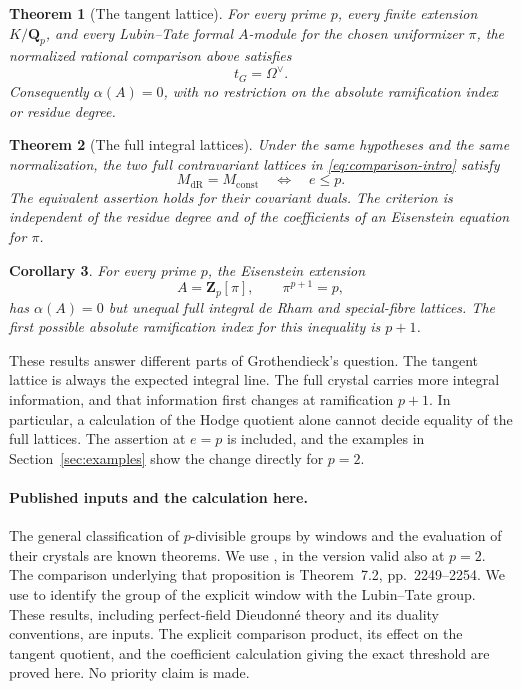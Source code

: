 \documentclass[11pt]{article}
\newtheorem{theorem}{Theorem}[section]
\newtheorem{corollary}[theorem]{Corollary}
\theoremstyle{definition}\newtheorem{definition}[theorem]{Definition}
\theoremstyle{remark}\newtheorem{remark}[theorem]{Remark}
\newcommand{\ZZ}{\mathbf Z}
\newcommand{\QQ}{\mathbf Q}
\newcommand{\dR}{\mathrm{dR}}
\begin{document}
\begin{theorem}[The tangent lattice]\label{thm:tangent}
For every prime $p$, every finite extension $K/\QQ_p$, and every Lubin--Tate formal $A$-module for the chosen uniformizer $\pi$, the normalized rational comparison above satisfies
\[
 t_G=\Omega^\vee.
\]
Consequently $\alpha(A)=0$, with no restriction on the absolute ramification index or residue degree.
\end{theorem}

\begin{theorem}[The full integral lattices]\label{thm:threshold}
Under the same hypotheses and the same normalization, the two full contravariant lattices in \eqref{eq:comparison-intro} satisfy
\[
 M_{\dR}=M_{\mathrm{const}}
 \quad\Longleftrightarrow\quad e\le p.
\]
The equivalent assertion holds for their covariant duals. The criterion is independent of the residue degree and of the coefficients of an Eisenstein equation for $\pi$.
\end{theorem}

\begin{corollary}\label{cor:counterexample}
For every prime $p$, the Eisenstein extension
\[
 A=\ZZ_p[\pi],\qquad \pi^{p+1}=p,
\]
has $\alpha(A)=0$ but unequal full integral de Rham and special-fibre lattices. The first possible absolute ramification index for this inequality is $p+1$.
\end{corollary}

These results answer different parts of Grothendieck's question. The tangent lattice is always the expected integral line. The full crystal carries more integral information, and that information first changes at ramification $p+1$. In particular, a calculation of the Hodge quotient alone cannot decide equality of the full lattices. The assertion at $e=p$ is included, and the examples in Section~\ref{sec:examples} show the change directly for $p=2$.

\paragraph{Published inputs and the calculation here.}
The general classification of $p$-divisible groups by windows and the evaluation of their crystals are known theorems. We use \citet[Remark~6.3 and Corollary~6.7, pp.~2245--2248; Proposition~7.1, pp.~2248--2249]{Lau}, in the version valid also at $p=2$. The comparison underlying that proposition is Theorem~7.2, pp.~2249--2254. We use \citet[Lemma~1 and Theorem~1, pp.~381--383, and the criterion following Theorem~1 on p.~383]{LubinTate} to identify the group of the explicit window with the Lubin--Tate group. These results, including perfect-field Dieudonn\'e theory and its duality conventions, are inputs. The explicit comparison product, its effect on the tangent quotient, and the coefficient calculation giving the exact threshold are proved here. No priority claim is made.
\end{document}
